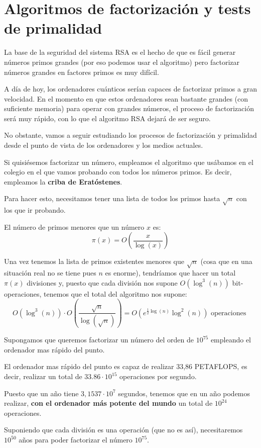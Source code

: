 \chapter{Algoritmos de factorización y tests de primalidad}

La base de la seguridad del sistema RSA es el hecho de que es fácil generar números primos grandes (por eso podemos usar el algoritmo) pero factorizar números grandes en factores primos es muy difícil.

A día de hoy, los ordenadores cuánticos serían capaces de factorizar primos a gran velocidad. En el momento en que estos ordenadores sean bastante grandes (con suficiente memoria) para operar con grandes números, el proceso de factorización será muy rápido, con lo que el algoritmo RSA dejará de ser seguro.

No obstante, vamos a seguir estudiando los procesos de factorización y primalidad desde el punto de vista de los ordenadores y los medios actuales.

Si quisiésemos factorizar un número, empleamos el algoritmo que usábamos en el colegio en el que vamos probando con todos los números primos. Es decir, empleamos la \textbf{criba de Eratóstenes}.

Para hacer esto, necesitamos tener una lista de todos los primos hasta $\sqrt{n}$ con los que ir probando.

\begin{theorem}
El número de primos menores que un número $x$ es:
\[π(x) = O\left( \frac{x}{\log(x)}\right)\]
\end{theorem}

Una vez tenemos la lista de primos existentes menores que $\sqrt{n}$ (cosa que en una situación real no se tiene pues $n$ es enorme), tendríamos que hacer un total $π(x)$ divisiones y, puesto que cada división nos supone $O(\log^3(n))$ bit-operaciones, tenemos que el total del algoritmo nos supone:
\[O(\log^3(n))\cdot O\left(\frac{\sqrt{n}}{\log(\sqrt{n})}\right) = O\left( e^{\frac{1}{2}\log(n)}\log^2(n)\right) \text{ operaciones }\]

\begin{example}
Supongamos que queremos factorizar un número del orden de $10^{75}$ empleando el ordenador mas rápido del punto.

El ordenador mas rápido del punto es capaz de realizar 33,86 PETAFLOPS, es decir, realizar un total de $33.86 \cdot 10^{15}$ operaciones por segundo.

Puesto que un año tiene $3,1537 \cdot 10^{7}$ segundos, tenemos que en un año podemos realizar, \textbf{con el ordenador más potente del mundo} un total de $10^{24}$ operaciones.

Suponiendo que cada división es una operación (que no es así), necesitaremos $10^{50}$ años para poder factorizar el número $10^{75}$.
\end{example}

